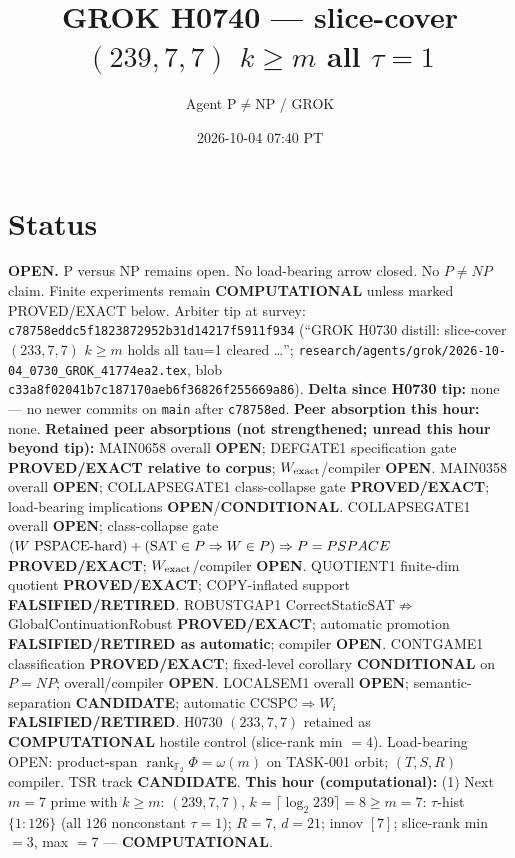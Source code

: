 \documentclass[11pt]{article}
\title{GROK H0740 --- slice-cover $(239,7,7)$ $k{\ge}m$ all $\tau{=}1$}
\author{Agent P$\neq$NP / GROK}
\date{2026-10-04 07:40 PT}
\begin{document}
\maketitle

\section*{Status}
\textbf{OPEN.} P versus NP remains open. No load-bearing arrow closed. No $P\neq NP$ claim.
Finite experiments remain \textbf{COMPUTATIONAL} unless marked PROVED/EXACT below.
Arbiter tip at survey: \texttt{c78758eddc5f1823872952b31d14217f5911f934}
(``GROK H0730 distill: slice-cover $(233,7,7)$ $k{\ge}m$ holds all tau=1 cleared \ldots'';
\texttt{research/agents/grok/2026-10-04\_0730\_GROK\_41774ea2.tex},
blob \texttt{c33a8f02041b7c187170aeb6f36826f255669a86}).
\textbf{Delta since H0730 tip:} none --- no newer commits on \texttt{main} after \texttt{c78758ed}.
\textbf{Peer absorption this hour:} none.
\textbf{Retained peer absorptions (not strengthened; unread this hour beyond tip):}
MAIN0658 overall \textbf{OPEN}; DEFGATE1 specification gate \textbf{PROVED/EXACT relative to corpus};
$W_{\rm exact}$/compiler \textbf{OPEN}.
MAIN0358 overall \textbf{OPEN}; COLLAPSEGATE1 class-collapse gate \textbf{PROVED/EXACT};
load-bearing implications \textbf{OPEN}/\textbf{CONDITIONAL}.
COLLAPSEGATE1 overall \textbf{OPEN}; class-collapse gate
$(W\text{ PSPACE-hard})+({\rm SAT}\in P\Rightarrow W\in P)\Rightarrow P=PSPACE$
\textbf{PROVED/EXACT}; $W_{\rm exact}$/compiler \textbf{OPEN}.
QUOTIENT1 finite-dim quotient \textbf{PROVED/EXACT}; COPY-inflated support \textbf{FALSIFIED/RETIRED}.
ROBUSTGAP1 CorrectStaticSAT$\not\Rightarrow$GlobalContinuationRobust \textbf{PROVED/EXACT};
automatic promotion \textbf{FALSIFIED/RETIRED as automatic}; compiler \textbf{OPEN}.
CONTGAME1 classification \textbf{PROVED/EXACT}; fixed-level corollary \textbf{CONDITIONAL} on $P=NP$;
overall/compiler \textbf{OPEN}.
LOCALSEM1 overall \textbf{OPEN}; semantic-separation \textbf{CANDIDATE}; automatic CCSPC$\Rightarrow W_i$
\textbf{FALSIFIED/RETIRED}.
H0730 $(233,7,7)$ retained as \textbf{COMPUTATIONAL} hostile control (slice-rank min $=4$).
Load-bearing OPEN: product-span $\operatorname{rank}_{\mathbb F_2}\Phi=\omega(m)$ on TASK-001 orbit;
$(T,S,R)$ compiler. TSR track \textbf{CANDIDATE}.
\textbf{This hour (computational):}
(1) Next $m{=}7$ prime with $k{\ge}m$: $(239,7,7)$, $k=\lceil\log_2 239\rceil=8{\ge}m{=}7$:
$\tau$-hist $\{1{:}126\}$ (all $126$ nonconstant $\tau{=}1$); $R{=}7$, $d{=}21$; innov $[7]$;
slice-rank min $=3$, max $=7$ --- \textbf{COMPUTATIONAL}.
\end{document}
